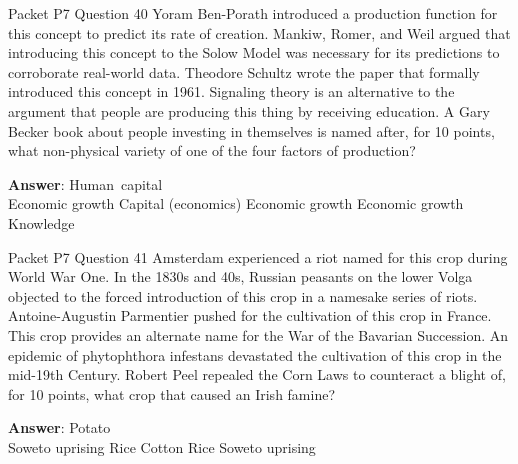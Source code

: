 \begin{frame}{Packet P7 Question 40}
Yoram Ben-Porath introduced a production function for this concept to predict its rate of creation. Mankiw, Romer, and Weil argued that introducing this concept to the Solow Model was   necessary for its predictions to corroborate real-world data. Theodore Schultz wrote the paper that formally introduced this concept in 1961. Signaling theory is an alternative to the argument that people are producing this thing by receiving education. A Gary Becker book about people investing in themselves is named after, for 10 points, what non-physical variety of one of the four factors of production?        

\textbf{Answer}: Human\ capital\\
 Economic growth
 Capital (economics)
 Economic growth
 Economic growth
 Knowledge
\end{frame}

\begin{frame}{Packet P7 Question 41}
Amsterdam experienced a riot named for this   crop during World War One. In the 1830s and 40s, Russian peasants on the lower Volga objected to the forced introduction of this crop in a namesake series of riots. Antoine-Augustin Parmentier pushed for the cultivation of this crop in France. This crop provides   an alternate name for the War of the Bavarian Succession.   An epidemic of phytophthora infestans devastated the cultivation of this crop in the mid-19th Century. Robert Peel repealed the Corn Laws to counteract a blight of, for 10 points, what crop that caused an Irish famine?      

\textbf{Answer}: Potato\\
 Soweto uprising
 Rice
 Cotton
 Rice
 Soweto uprising
\end{frame}

